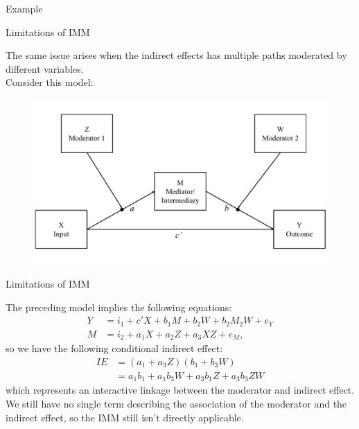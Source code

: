 \documentclass{beamer}
\newcommand{\va}[0]{\vspace{12pt}}
\begin{document}
\begin{frame}[allowframebreaks]{Example}
    




\pagebreak



\end{frame}



\begin{frame}{Limitations of IMM}
  
  The same issue arises when the indirect effects has multiple paths
  moderated by different variables.\\ 
  \va 
  Consider this model:
  \begin{figure}
    \includegraphics[width = \textwidth]{figures/modAwithZ_BwithWConceptual.pdf}
  \end{figure}
  
\end{frame}



\begin{frame}{Limitations of IMM}
  
  The preceding model implies the following equations:
  \begin{align}
    Y &= i_1 + c'X + b_1M + b_2W + b_2M_2W + e_{Y}\\
    M &= i_2 + a_1X + a_2Z + a_3XZ + e_{M},
  \end{align}
  so we have the following conditional indirect effect:
  \begin{align*}
    IE &= \left(a_1 + a_3Z\right) \left(b_1 + b_3W \right)\\
    &= a_1b_1 + a_1b_3W + a_3b_1Z + a_3b_3ZW
  \end{align*}
  which represents an interactive linkage between the moderator and
  indirect effect.\\ 
  \va 
  We still have no single term describing the
  association of the moderator and the indirect effect, so the
  \citet{hayes:2015} IMM still isn't directly applicable.
  
\end{frame}
  
\end{document}
